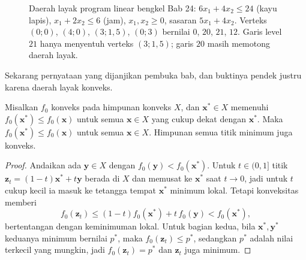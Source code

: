 \begin{figure}[!ht]
\centering
{}
\caption{Daerah layak program linear bengkel Bab 24: $6x_{1}+4x_{2}\le24$ (kayu lapis),
$x_{1}+2x_{2}\le6$ (jam), $x_{1},x_{2}\ge0$, sasaran $5x_{1}+4x_{2}$. Verteks
$(0;0)$, $(4;0)$, $(3;1{,}5)$, $(0;3)$ bernilai $0$, $20$, $21$, $12$. Garis level $21$
hanya menyentuh verteks $(3;1{,}5)$; garis $20$ masih memotong daerah layak.}
\label{fig:lp-verteks}
\end{figure}


Sekarang pernyataan yang dijanjikan pembuka bab, dan buktinya pendek justru karena
daerah layak konveks.

\begin{teorema}
Misalkan $f_{0}$ konveks pada himpunan konveks $X$, dan $\mathbf{x}^{*}\in X$ memenuhi
$f_{0}(\mathbf{x}^{*})\le f_{0}(\mathbf{x})$ untuk semua $\mathbf{x}\in X$ yang cukup
dekat dengan $\mathbf{x}^{*}$. Maka $f_{0}(\mathbf{x}^{*})\le f_{0}(\mathbf{x})$ untuk
semua $\mathbf{x}\in X$. Himpunan semua titik minimum juga konveks.
\end{teorema}

\begin{proof}
Andaikan ada $\mathbf{y}\in X$ dengan $f_{0}(\mathbf{y})<f_{0}(\mathbf{x}^{*})$. Untuk
$t\in(0,1]$ titik $\mathbf{z}_{t}=(1-t)\mathbf{x}^{*}+t\mathbf{y}$ berada di $X$ dan
memusat ke $\mathbf{x}^{*}$ saat $t\to0$, jadi untuk $t$ cukup kecil ia masuk ke
tetangga tempat $\mathbf{x}^{*}$ minimum lokal. Tetapi konveksitas memberi
\[
  f_{0}(\mathbf{z}_{t})\le(1-t)f_{0}(\mathbf{x}^{*})+t\,f_{0}(\mathbf{y})
  <f_{0}(\mathbf{x}^{*}),
\]
bertentangan dengan keminimuman lokal. Untuk bagian kedua, bila
$\mathbf{x}^{*},\mathbf{y}^{*}$ keduanya minimum bernilai $p^{*}$, maka
$f_{0}(\mathbf{z}_{t})\le p^{*}$, sedangkan $p^{*}$ adalah nilai terkecil yang mungkin,
jadi $f_{0}(\mathbf{z}_{t})=p^{*}$ dan $\mathbf{z}_{t}$ juga minimum.
\end{proof}


